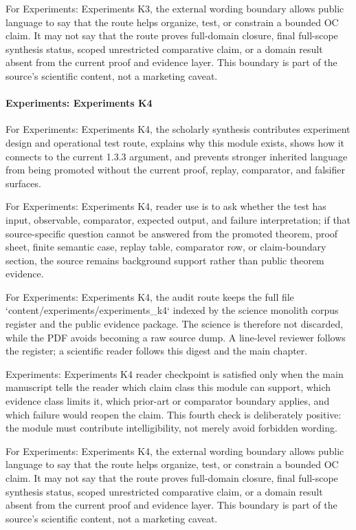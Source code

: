 For Experiments: Experiments K3, the external wording boundary allows public language to say that the route helps organize, test, or constrain a bounded OC claim. It may not say that the route proves full-domain closure, final full-scope synthesis status, scoped unrestricted comparative claim, or a domain result absent from the current proof and evidence layer. This boundary is part of the source's scientific content, not a marketing caveat.


\paragraph{Experiments: Experiments K4}

For Experiments: Experiments K4, the scholarly synthesis contributes experiment design and operational test route, explains why this module exists, shows how it connects to the current 1.3.3 argument, and prevents stronger inherited language from being promoted without the current proof, replay, comparator, and falsifier surfaces.


For Experiments: Experiments K4, reader use is to ask whether the test has input, observable, comparator, expected output, and failure interpretation; if that source-specific question cannot be answered from the promoted theorem, proof sheet, finite semantic case, replay table, comparator row, or claim-boundary section, the source remains background support rather than public theorem evidence.


For Experiments: Experiments K4, the audit route keeps the full file `content/experiments/experiments\_k4` indexed by the science monolith corpus register and the public evidence package. The science is therefore not discarded, while the PDF avoids becoming a raw source dump. A line-level reviewer follows the register; a scientific reader follows this digest and the main chapter.


Experiments: Experiments K4 reader checkpoint is satisfied only when the main manuscript tells the reader which claim class this module can support, which evidence class limits it, which prior-art or comparator boundary applies, and which failure would reopen the claim. This fourth check is deliberately positive: the module must contribute intelligibility, not merely avoid forbidden wording.


For Experiments: Experiments K4, the external wording boundary allows public language to say that the route helps organize, test, or constrain a bounded OC claim. It may not say that the route proves full-domain closure, final full-scope synthesis status, scoped unrestricted comparative claim, or a domain result absent from the current proof and evidence layer. This boundary is part of the source's scientific content, not a marketing caveat.


